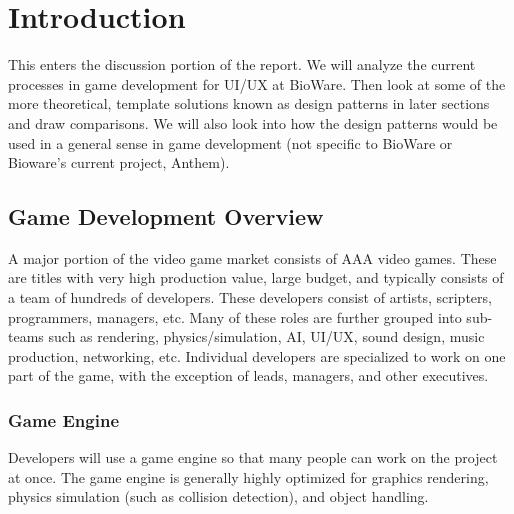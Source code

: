 \section{Introduction}

\iftwocolumns
\begin{multicols}{2}
\fi

This enters the discussion portion of the report. We will analyze the current processes in game development for UI/UX at BioWare. Then look at some of the more theoretical, template solutions known as design patterns in later sections and draw comparisons. We will also look into how the design patterns would be used in a general sense in game development (not specific to BioWare or Bioware's current project, Anthem).

\subsection{Game Development Overview}



A major portion of the video game market consists of AAA video games. These are titles with very high production value, large budget, and typically consists of a team of hundreds of developers. These developers consist of artists, scripters, programmers, managers, etc. Many of these roles are further grouped into sub-teams such as rendering, physics/simulation, AI, UI/UX, sound design, music production, networking, etc. Individual developers are specialized to work on one part of the game, with the exception of leads, managers, and other executives.

\subsubsection{Game Engine}
Developers will use a game engine so that many people can work on the project at once. The game engine is generally highly optimized for graphics rendering, physics simulation (such as collision detection), and object handling.\bs


\end{multicols}
